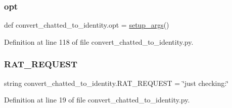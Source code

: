 \subsubsection{\texorpdfstring{opt}{opt}}
{\footnotesize\ttfamily def convert\+\_\+chatted\+\_\+to\+\_\+identity.\+opt = \hyperlink{namespaceconvert__chatted__to__identity_afcf3d0107d9de04c08b48929cf9d1a98}{setup\+\_\+args}()}



Definition at line 118 of file convert\+\_\+chatted\+\_\+to\+\_\+identity.\+py.

\mbox{\label{namespaceconvert__chatted__to__identity_aa0293030e3a25ceb0a4102fe4dd40c98}} 
\subsubsection{\texorpdfstring{R\+A\+T\+\_\+\+R\+E\+Q\+U\+E\+ST}{RAT\_REQUEST}}
{\footnotesize\ttfamily string convert\+\_\+chatted\+\_\+to\+\_\+identity.\+R\+A\+T\+\_\+\+R\+E\+Q\+U\+E\+ST = \char`\"{}just checking\+:\char`\"{}}



Definition at line 19 of file convert\+\_\+chatted\+\_\+to\+\_\+identity.\+py.

